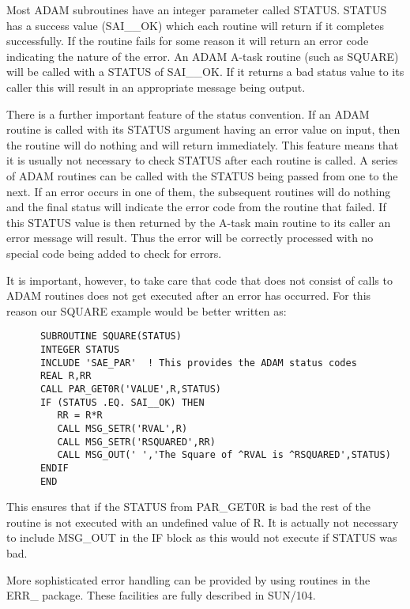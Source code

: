 Most ADAM subroutines have an integer parameter called STATUS. STATUS has a
success value (SAI\_\_OK) which each routine will return if it completes
successfully. If the routine fails for some reason it will return an error code
indicating the nature of the error. An ADAM A-task routine (such as SQUARE)
will be called with a STATUS of SAI\_\_OK. If it returns a bad status value to
its caller this will result in an appropriate message being output.

There is a further important feature of the status convention. If an
ADAM routine is called with its STATUS argument having an error value
on input, then the routine will do nothing and will return immediately.
This feature means that it is usually not necessary to check STATUS
after each routine is called. A series of ADAM routines can be called
with the STATUS being passed from one to the next. If an error occurs in
one of them, the subsequent routines will do nothing and the final status
will indicate the error code from the routine that failed. If this STATUS
value is then returned by the A-task main routine to its caller an error
message will result. Thus the error will be correctly processed with no
special code being added to check for errors.

It is important, however, to take care that code that does not consist of
calls to ADAM routines does not get executed after an error has occurred.
For this reason our SQUARE example would be better written as:

\begin{verbatim}
      SUBROUTINE SQUARE(STATUS)
      INTEGER STATUS
      INCLUDE 'SAE_PAR'  ! This provides the ADAM status codes
      REAL R,RR
      CALL PAR_GET0R('VALUE',R,STATUS)                        
      IF (STATUS .EQ. SAI__OK) THEN
         RR = R*R           
         CALL MSG_SETR('RVAL',R)
         CALL MSG_SETR('RSQUARED',RR)
         CALL MSG_OUT(' ','The Square of ^RVAL is ^RSQUARED',STATUS)
      ENDIF
      END
\end{verbatim}                                               
         
This ensures that if the STATUS from PAR\_GET0R is bad the rest of the routine
is not executed with an undefined value of R. It is actually not necessary
to include MSG\_OUT in the IF block as this would not execute if STATUS was
bad.                  

More sophisticated error handling can be provided by using routines in the
ERR\_ package. These facilities are fully described in SUN/104.

